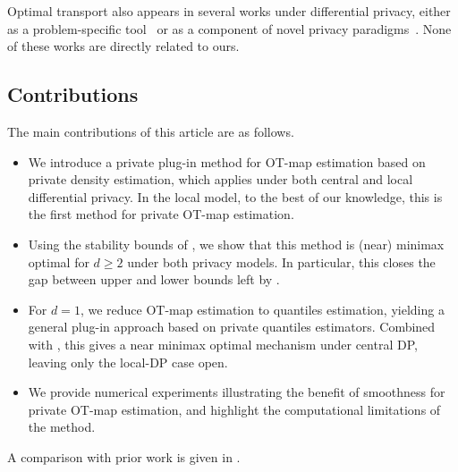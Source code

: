 \documentclass{article}
\newcommand{\1}{\mathds{1}}
\theoremstyle{plain}
\theoremstyle{definition}
\theoremstyle{remark}
\begin{document}
Optimal transport also appears in several works under differential privacy, either as a problem-specific tool~\cite{rakotomamonjy2021DPslicedWasserstein,harder2021dp,segag2023gradientFlow,tien2019DPOTdomainAdapt,rodriguezvitores2025slicedprivacy} or as a component of novel privacy paradigms~\cite{pierquin2024Pufferfish,Kawamoto2019localObfuscation,yang2024wassersteinDP}. None of these works are directly related to ours.




\subsection{Contributions}

The main contributions of this article are as follows.
\begin{itemize}
    \item We introduce a private plug-in method for OT-map estimation based on private density estimation, which applies under both central and local differential privacy. In the local model, to the best of our knowledge, this is the first method for private OT-map estimation.
    
    \item Using the stability bounds of \cite{balakrishnan2025stabilityboundssmoothoptimal}, we show that this method is (near) minimax optimal for $d \geq 2$ under both privacy models. In particular, this closes the gap between upper and lower bounds left by \cite{lalanne2025PrivateOTMaps}.
    
    \item For $d=1$, we reduce OT-map estimation to quantiles estimation, yielding a general plug-in approach based on private quantiles estimators. Combined with \cite{kaplan2022differentially}, this gives a near minimax optimal mechanism under central DP, leaving only the local-DP case open.
    
    \item We provide numerical experiments illustrating the benefit of smoothness for private OT-map estimation, and  highlight the computational limitations of the method.
\end{itemize}
A comparison with prior work is given in .
\end{document}
